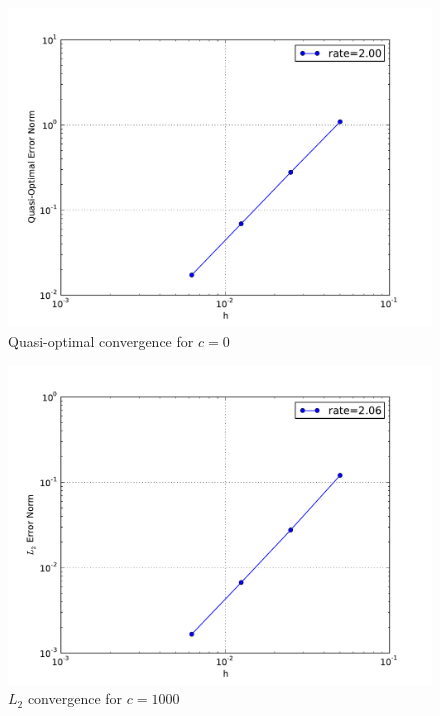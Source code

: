 \documentclass[10pt,letterpaper]{article}
\begin{document}
\begin{figure}[p]
\begin{center}
\includegraphics[width=5in]{epc0.pdf}
\end{center}
\caption{Quasi-optimal convergence for $c=0$}
\end{figure}

\begin{figure}[p]
\begin{center}
\includegraphics[width=5in]{ec1000.pdf}
\end{center}
\caption{$L_2$ convergence for $c=1000$}
\end{figure}
\end{document}
